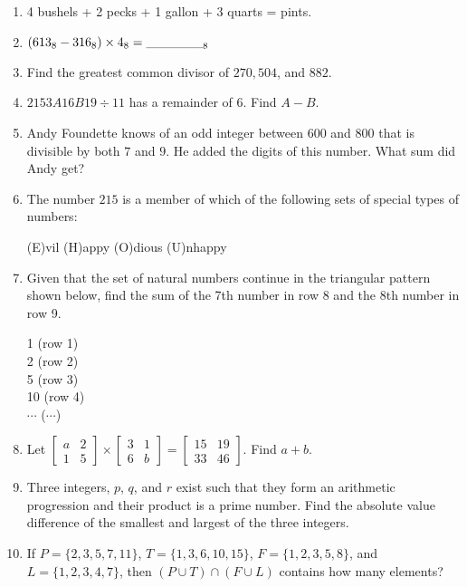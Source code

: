 \documentclass[../uilmath.tex]{subfiles}
\begin{document}
\begin{enumerate}[label=\bfseries\arabic*.]
    \item %
    4 bushels + 2 pecks + 1 gallon + 3 quarts = \blank pints.

    \item %
    $(613_8-316_8)\times 4_8 = \_\_\_\_\_\__8$

    \item %
    Find the greatest common divisor of $270,504$, and $882$.

    \item %
    $2153A16B19\div 11$ has a remainder of $6$. Find $A-B$.

    \item %
    Andy Foundette knows of an odd integer between $600$ and $800$ that is divisible by both $7$ and $9$. He added the digits of this number. What sum did Andy get?

    \item %
    The number $215$ is a member of which of the following sets of special types of numbers:
    \begin{center}
        (E)vil \quad (H)appy \quad (O)dious \quad (U)nhappy
    \end{center}

    \item %
    Given that the set of natural numbers continue in the triangular pattern shown below, find the sum of the 7th number in row 8 and the 8th number in row 9.
    \begin{center}
        1 \qquad (row 1)\\
        2   \qquad (row 2)\\
        5     \qquad (row 3)\\
        10       \qquad (row 4)\\
        $\cdots$ \qquad ($\cdots$)
    \end{center}

    \item %
    Let $\begin{bmatrix}
        a & 2\\
        1 & 5
    \end{bmatrix}\times \begin{bmatrix}
        3 & 1\\
        6 & b
    \end{bmatrix}=\begin{bmatrix}
        15 & 19\\
        33 & 46
    \end{bmatrix}$. Find $a+b$.

    \item %
    Three integers, $p$, $q$, and $r$ exist such that they form an arithmetic progression and their product is a prime number. Find the absolute value difference of the smallest and largest of the three integers.

    \item %
    If $P=\{2,3,5,7,11\}$, $T=\{1,3,6,10,15\}$, $F=\{1,2,3,5,8\}$, and $L=\{1,2,3,4,7\}$, then $(P\cup T)\cap (F\cup L)$ contains how many elements?
    
\end{enumerate}
\end{document}

